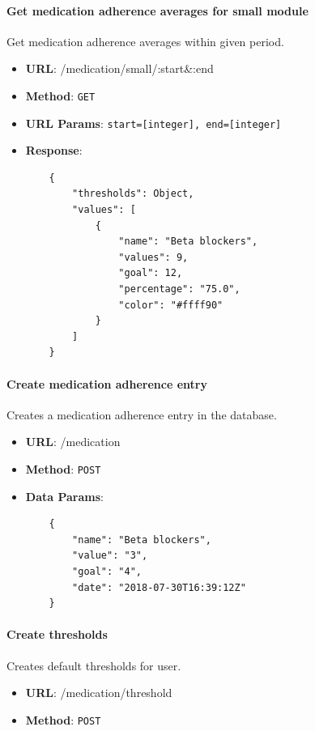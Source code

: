         \paragraph{Get medication adherence averages for small module} Get medication adherence averages within given period.
        \begin{itemize}
            \item \textbf{URL}: /medication/small/:start\&:end
            \item \textbf{Method}: \texttt{GET}
            \item \textbf{URL Params}: \texttt{start=[integer], end=[integer]}
            \item \textbf{Response}: \begin{verbatim}
    {
        "thresholds": Object,
        "values": [
            {
                "name": "Beta blockers",
                "values": 9,
                "goal": 12,
                "percentage": "75.0",
                "color": "#ffff90"
            }
        ]
    }
            \end{verbatim}
        \end{itemize}

        \paragraph{Create medication adherence entry} Creates a medication adherence entry in the database.
        \begin{itemize}
            \item \textbf{URL}: /medication
            \item \textbf{Method}: \texttt{POST}
            \item \textbf{Data Params}: \begin{verbatim}
    {
        "name": "Beta blockers",
        "value": "3",
        "goal": "4",
        "date": "2018-07-30T16:39:12Z"
    }   
            \end{verbatim}
        \end{itemize}

        \paragraph{Create thresholds} Creates default thresholds for user.
        \begin{itemize}
            \item \textbf{URL}: /medication/threshold
            \item \textbf{Method}: \texttt{POST}
        \end{itemize}

